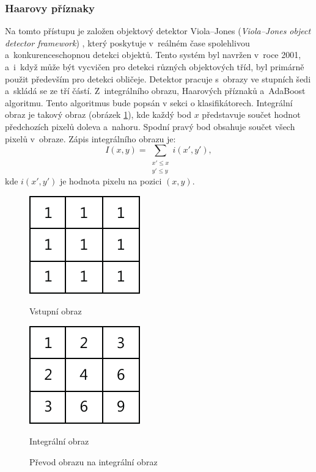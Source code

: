 \subsubsection*{Haarovy příznaky}
Na tomto přístupu je založen objektový detektor Viola--Jones (\textit{Viola--Jones object detector framework}) \cite{violajones}, který poskytuje v~reálném čase spolehlivou a~konkurenceschopnou detekci objektů. Tento systém byl navržen v~roce 2001, a~i~když může být vycvičen pro detekci různých objektových tříd, byl primárně použit především pro detekci obličeje. Detektor pracuje s~obrazy ve stupních šedi a~skládá se ze tří částí. Z~integrálního obrazu, Haarových příznaků a~AdaBoost\cite{adaboost} algoritmu. Tento algoritmus bude popsán v sekci o klasifikátorech. 
Integrální obraz je takový obraz (obrázek \ref{fig:integralimage}), kde každý bod $x$ představuje součet hodnot předchozích pixelů doleva a~nahoru. Spodní pravý bod obsahuje součet všech pixelů v~obraze.
Zápis integrálního obrazu je:
\begin{equation*}
\label{integralimage}
 I(x, y) = \sum_{\substack{x' \leq x \\ y' \leq y}}{} i(x', y'),
\end{equation*}
kde $i(x', y')$ je hodnota pixelu na pozici $(x, y)$.
\begin{figure}[H]
\centering
\begin{minipage}{.4\textwidth}
  \centering
  \includegraphics[width=.5\linewidth]{figures/ii_input}
  \caption*{Vstupní obraz}
  \label{fig:ii_input}
\end{minipage}%
\begin{minipage}{.4\textwidth}
  \centering
  \includegraphics[width=.5\linewidth]{figures/ii_output}
  \caption*{Integrální obraz}
  \label{fig:ii_output}
\end{minipage}
\caption{Převod obrazu na integrální obraz}
\label{fig:integralimage}
\end{figure}

